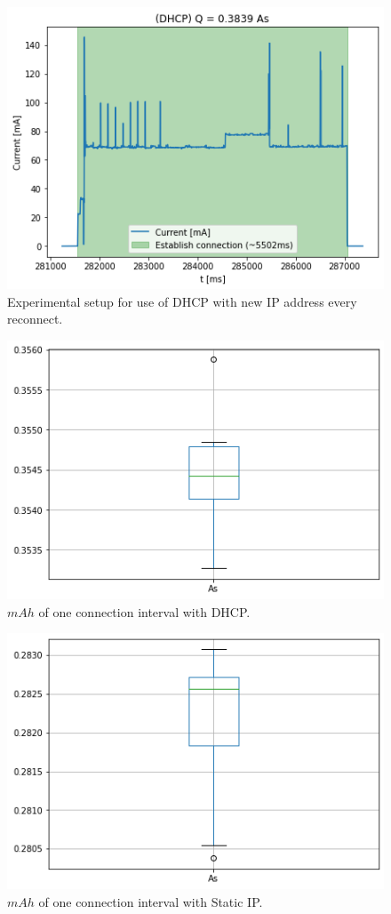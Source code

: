 \begin{figure}[h] 
    \centering
    \includegraphics[width =\linewidth]{fig/dhcp.png}
    \caption{Experimental setup for use of DHCP with new IP address every reconnect.}
    \label{fig:dhcp}
\end{figure}
\begin{figure}[h]
    \centering
    \includegraphics[width =\linewidth]{fig/dhcp_boxplot.png}
    \caption{$mAh$ of one connection interval with DHCP.}
    \label{fig:dhcp_boxplot}
\end{figure}
\begin{figure}[h]
    \centering
    \includegraphics[width =\linewidth]{fig/static_boxplot.png}
    \caption{$mAh$ of one connection interval with Static IP.}
    \label{fig:static_boxplot}
\end{figure}
\pagebreak